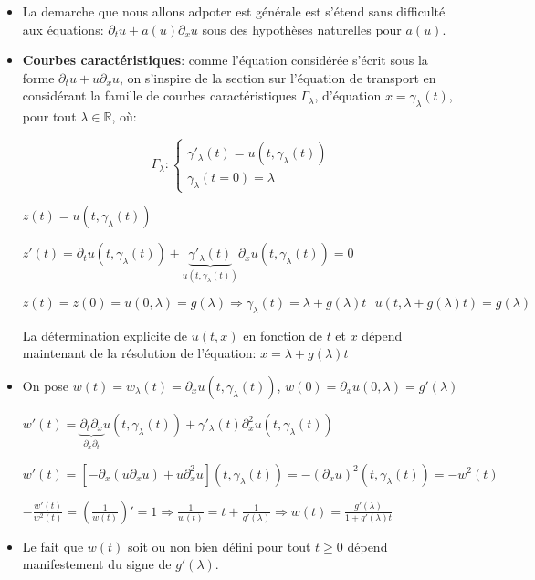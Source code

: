 \documentclass[10pt,a4paper,oneside]{article}
\begin{document}
\begin{itemize}
\item
La demarche que nous allons adpoter est générale est s'étend sans difficulté aux équations: $\partial_t u + a(u) \partial_x u$ sous des hypothèses naturelles pour $a(u)$.

\item
\textbf{Courbes caractéristiques}: comme l'équation considérée s'écrit sous la forme $\partial_t u + u \partial_x u$, on s'inspire de la section sur l'équation de transport en considérant la famille de courbes caractéristiques $\Gamma_\lambda$, d'équation $x = \gamma_{\lambda}(t)$, pour tout $\lambda \in \mathbb{R}$, où:

\[ \Gamma_\lambda : \begin{cases}
\gamma'_{\lambda}(t) = u(t,\gamma_{\lambda}(t)) \\
\gamma_{\lambda}(t = 0) = \lambda
\end{cases} \]

$z(t) = u(t,\gamma_{\lambda}(t))$

$z'(t) = \partial_t u(t,\gamma_{\lambda}(t)) + \underbrace{\gamma'_{\lambda}(t)}_{u(t,\gamma_{\lambda}(t))} \partial_x u(t,\gamma_{\lambda}(t)) = 0$

$z(t) = z(0) = u(0,\lambda) = g(\lambda) \Rightarrow \boxed{\gamma_{\lambda}(t) = \lambda + g(\lambda)t} \text{  } \boxed{u(t,\lambda + g(\lambda)t) = g(\lambda)}$

La détermination explicite de $u(t,x)$ en fonction de $t$ et $x$ dépend maintenant de la résolution de l'équation: $x = \lambda + g(\lambda) t$

\item
On pose $w(t) = w_\lambda(t) = \partial_x u(t,\gamma_{\lambda}(t))$, $w(0) = \partial_x u(0,\lambda) = g'(\lambda)$

$w'(t) = \underbrace{\partial_t \partial_x}_{\partial_x \partial_t} u(t,\gamma_{\lambda}(t)) + \gamma'_{\lambda}(t) \partial^2_x u(t,\gamma_{\lambda}(t))$

$w'(t) = [-\partial_x(u \partial_x u) + u\partial^2_x u](t,\gamma_{\lambda}(t)) = -(\partial_x u)^2 (t,\gamma_{\lambda}(t)) = -w^2(t)$

$-\frac{w'(t)}{w^2(t)} = (\frac{1}{w(t)})' = 1 \Rightarrow \frac{1}{w(t)} = t + \frac{1}{g'(\lambda)} \Rightarrow \boxed{w(t) = \frac{g'(\lambda)}{1 + g'(\lambda)t}}$

\item
Le fait que $w(t)$ soit ou non bien défini pour tout $t \geq 0$ dépend manifestement du signe de $g'(\lambda)$.


\end{itemize}
\end{document}
